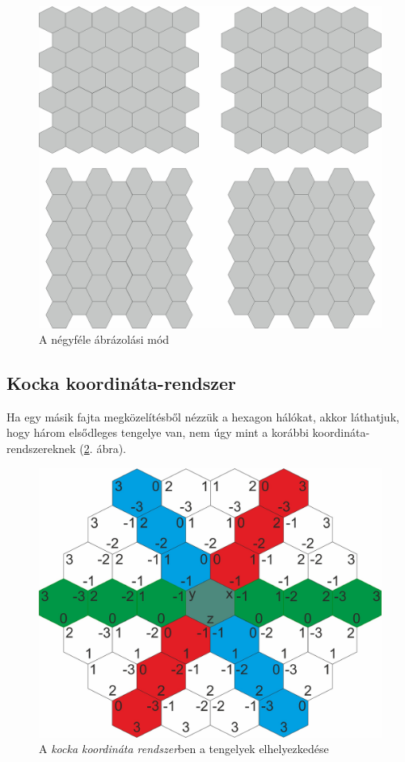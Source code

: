 \begin{figure}[h!]
\centering
\includegraphics[scale=0.2]{kepek/OffsetFour.jpg}
\caption{A négyféle ábrázolási mód}
\label{fig:OffsetFour}
\end{figure}

\subsection{Kocka koordináta-rendszer}

Ha egy másik fajta megközelítésből nézzük a hexagon hálókat, akkor láthatjuk, hogy három elsődleges tengelye van, nem úgy mint a korábbi koordináta-rendszereknek (\ref{fig:CubeCoord}. ábra). 

\begin{figure}[h!]
\centering
\includegraphics[scale=0.2]{kepek/CubeCoord.jpg}
\caption{A \textit{kocka koordináta rendszer}ben a tengelyek elhelyezkedése}
\label{fig:CubeCoord}
\end{figure}

